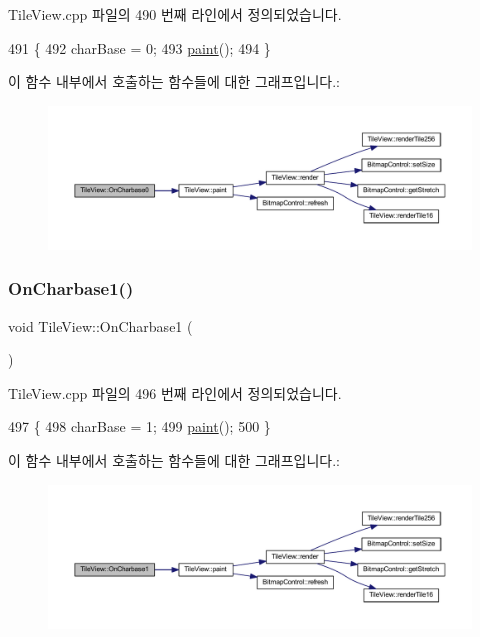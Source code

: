Tile\+View.\+cpp 파일의 490 번째 라인에서 정의되었습니다.


\begin{DoxyCode}
491 \{
492   charBase = 0;
493   \mbox{\hyperlink{class_tile_view_a4341071a0cab0d5a8b6dfa7318230636}{paint}}();
494 \}
\end{DoxyCode}
이 함수 내부에서 호출하는 함수들에 대한 그래프입니다.\+:
\nopagebreak
\begin{figure}[H]
\begin{center}
\leavevmode
\includegraphics[width=350pt]{class_tile_view_a5b1b1e61396178f21ee28c6c7a779142_cgraph}
\end{center}
\end{figure}
\mbox{\label{class_tile_view_a4c2151cc553eabc4d08f8a8b6954aa72}} 
\subsubsection{\texorpdfstring{On\+Charbase1()}{OnCharbase1()}}
{\footnotesize\ttfamily void Tile\+View\+::\+On\+Charbase1 (\begin{DoxyParamCaption}{ }\end{DoxyParamCaption})\hspace{0.3cm}{\ttfamily [protected]}}



Tile\+View.\+cpp 파일의 496 번째 라인에서 정의되었습니다.


\begin{DoxyCode}
497 \{
498   charBase = 1;
499   \mbox{\hyperlink{class_tile_view_a4341071a0cab0d5a8b6dfa7318230636}{paint}}();
500 \}
\end{DoxyCode}
이 함수 내부에서 호출하는 함수들에 대한 그래프입니다.\+:
\nopagebreak
\begin{figure}[H]
\begin{center}
\leavevmode
\includegraphics[width=350pt]{class_tile_view_a4c2151cc553eabc4d08f8a8b6954aa72_cgraph}
\end{center}
\end{figure}
\mbox{\label{class_tile_view_ab50f2c2c7575222ee7e4bb72161bbda7}} 

